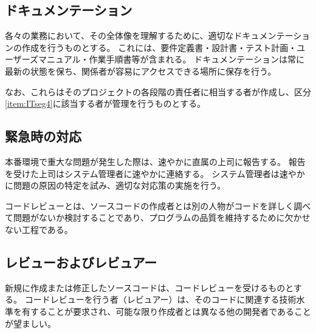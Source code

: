 \subsection{ドキュメンテーション}
各々の業務において、その全体像を理解するために、適切なドキュメンテーションの作成を行うものとする。
これには、要件定義書・設計書・テスト計画・ユーザーズマニュアル・作業手順書等が含まれる。
ドキュメンテーションは常に最新の状態を保ち、関係者が容易にアクセスできる場所に保存を行う。

なお、これらはそのプロジェクトの各段階の責任者に相当する者が作成し、区分\ref{item:ITseg4}\hx に該当する者が管理を行うものとする。

\subsection{緊急時の対応}
本番環境で重大な問題が発生した際は、速やかに直属の上司に報告する。
報告を受けた上司はシステム管理者に速やかに連絡する。
システム管理者は速やかに問題の原因の特定を試み、適切な対応策の実施を行う。



\clearpage
コードレビューとは、ソースコードの作成者とは別の人物がコードを詳しく調べて問題がないか検討することであり、プログラムの品質を維持するために欠かせない工程である。

\subsection{レビューおよびレビュアー}
新規に作成または修正したソースコードは、コードレビューを受けるものとする。
コードレビューを行う者（レビュアー）は、そのコードに関連する技術水準を有することが要求され、可能な限り作成者とは異なる他の開発者であることが望ましい。


